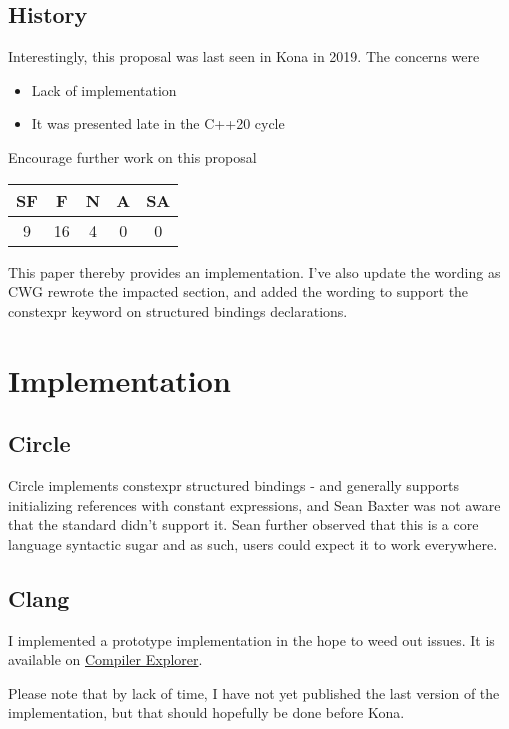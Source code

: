 \documentclass{wg21}
\begin{document}
\subsection{History}

Interestingly, this proposal was last seen in Kona in 2019.
The concerns were
\begin{itemize}
    \item Lack of implementation
    \item It was presented late in the C++20 cycle
\end{itemize}


\begin{quoteblock}
Encourage further work on this proposal

\begin{tabular}{|c|c|c|c|c|}
    \hline
    SF & F & N & A & SA\\
    \hline
    9 & 16 & 4 & 0 & 0 \\
    \hline
\end{tabular}
\end{quoteblock}

This paper thereby provides an implementation.
I've also update the wording as CWG rewrote the impacted section, and added the wording to support the constexpr keyword
on structured bindings declarations.

\section{Implementation}

\subsection{Circle}

Circle implements constexpr structured bindings - and generally supports initializing references with constant expressions,
and Sean Baxter was not aware that the standard didn't support it.
Sean further observed that this is a core language syntactic sugar and as such, users could expect it to work everywhere.

\subsection{Clang}
I implemented a prototype implementation in the hope to weed out issues.
It is available on \href{https://godbolt.org/z/dWWxcEEf9}{Compiler Explorer}.

Please note that by lack of time, I have not yet published the last version of the implementation, but that should hopefully be
done before Kona.
\end{document}
